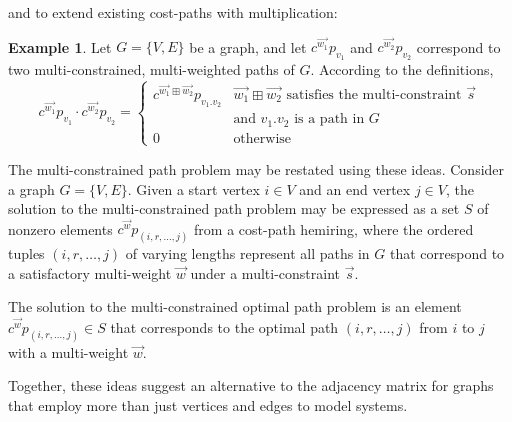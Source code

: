 \documentclass[12pt]{amsart}
\theoremstyle{definition}
\newtheorem{example}[thm]{Example}
\theoremstyle{remark}
\numberwithin{equation}{section}
\begin{document}
and to extend existing cost-paths with multiplication:

\begin{example}
Let $G = \{V,E\}$ be a graph, and let $c^{\vec{w_1}} p_{v_1}$ and $c^{\vec{w_2}} p_{v_2}$ correspond to two multi-constrained, multi-weighted paths of $G$. According to the definitions,
$$
	c^{\vec{w_1}} p_{v_1} \cdot  c^{\vec{w_2}} p_{v_2} = \left\{
		\begin{array}{ll}
			c^{\vec{w_1}\boxplus\vec{w_2}} p_{v_1.v_2} & \vec{w_1} \boxplus \vec{w_2} \text{ satisfies the multi-constraint } \vec{s} \\
			   & \text{and } v_1.v_2 \text{ is a path in } G \\
			0 & \text{otherwise}
		\end{array}
	\right.
$$
\end{example}

The multi-constrained path problem may be restated using these ideas. Consider a graph $G = \{V,E\}$. Given a start vertex $i \in V$ and an end vertex $j \in V$, the solution to the multi-constrained path problem may be expressed as a set $S$ of nonzero elements $c^{\vec{w}} p_{(i,r,\ldots,j)}$ from a cost-path hemiring, where the ordered tuples $(i,r,\ldots,j)$ of varying lengths represent all paths in $G$ that correspond to a satisfactory multi-weight $\vec{w}$ under a multi-constraint $\vec{s}$.

The solution to the multi-constrained optimal path problem is an element $c^{\vec{w}} p_{(i,r,\ldots,j)} \in S$ that corresponds to the optimal path $(i,r,\ldots,j)$ from $i$ to $j$ with a multi-weight $\vec{w}$.

Together, these ideas suggest an alternative to the adjacency matrix for graphs that employ more than just vertices and edges to model systems.
\end{document}
